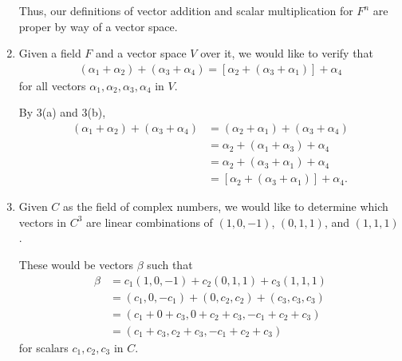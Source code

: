\documentclass[12pt]{article}
\begin{document}
\begin{enumerate}
    Thus, our definitions of vector addition and scalar multiplication for $F^{n}$
    are proper by way of a vector space.

  \item
    Given a field $F$ and a vector space $V$ over it, we would like to verify that
    \begin{align*}
      (\alpha_1 + \alpha_2) + (\alpha_3 + \alpha_4) =
      [\alpha_2 + (\alpha_3 + \alpha_1)] + \alpha_4
    \end{align*}
    for all vectors $\alpha_1,\alpha_2,\alpha_3,\alpha_4$ in $V$.

    By 3(a) and 3(b),
    \begin{align*}
      (\alpha_1 + \alpha_2) + (\alpha_3 + \alpha_4) &=
      (\alpha_2 + \alpha_1) + (\alpha_3 + \alpha_4)\\
      &= \alpha_2 + (\alpha_1 + \alpha_3) + \alpha_4\\
      &= \alpha_2 + (\alpha_3 + \alpha_1) + \alpha_4\\
      &= [\alpha_2 + (\alpha_3 + \alpha_1)] + \alpha_4.
    \end{align*}

  \item
    Given $C$ as the field of complex numbers, we would like to determine which
    vectors in $C^3$ are linear combinations of $(1,0,-1)$, $(0,1,1)$, and $(1,1,1)$.

    These would be vectors $\beta$ such that
    \begin{align*}
      \beta &= c_1(1,0,-1) + c_2(0,1,1) + c_3(1,1,1)\\
            &= (c_1,0,-c_1) + (0,c_2,c_2) + (c_3,c_3,c_3)\\
            &= (c_1+0+c_3,0+c_2+c_3,-c_1+c_2+c_3)\\
            &= (c_1+c_3,c_2+c_3,-c_1+c_2+c_3)
    \end{align*}
    for scalars $c_1,c_2,c_3$ in $C$.
\end{enumerate}
\end{document}
